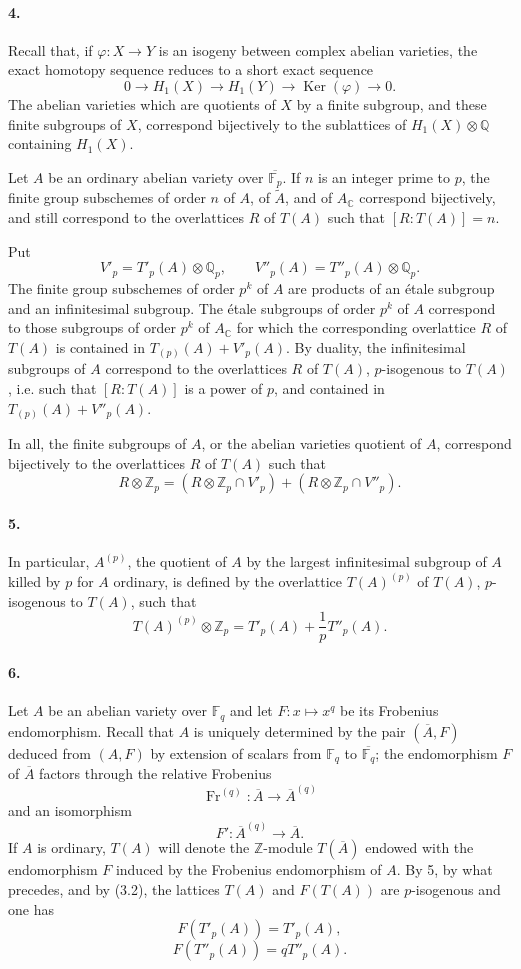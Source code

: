 \documentclass[10pt]{article}
\newcommand{\C}{\mathbb C}
\newcommand{\Fp}{\mathbb F_p}
\newcommand{\Fq}{\mathbb F_q}
\newcommand{\Q}{\mathbb Q}
\newcommand{\Z}{\mathbb Z}
\newcommand{\Ac}{A_{\C}}
\newcommand{\Ker}{\operatorname{Ker}}
\newcommand{\Fr}{\operatorname{Fr}}
\begin{document}
\paragraph{4.} Recall that, if $\varphi:X\to Y$ is an isogeny between complex abelian varieties, the exact homotopy sequence reduces to a short exact sequence
\[
0\longrightarrow H_1(X)\longrightarrow H_1(Y)\longrightarrow\Ker(\varphi)\longrightarrow0.
\]
The abelian varieties which are quotients of $X$ by a finite subgroup, and these finite subgroups of $X$, correspond bijectively to the sublattices of $H_1(X)\otimes\Q$ containing $H_1(X)$.

Let $A$ be an ordinary abelian variety over $\overline{\Fp}$. If $n$ is an integer prime to $p$, the finite group subschemes of order $n$ of $A$, of $\widetilde A$, and of $\Ac$ correspond bijectively, and still correspond to the overlattices $R$ of $T(A)$ such that $[R:T(A)]=n$.

Put
\[
V'_p=T'_p(A)\otimes\Q_p,\qquad V''_p(A)=T''_p(A)\otimes\Q_p.
\]
The finite group subschemes of order $p^k$ of $A$ are products of an étale subgroup and an infinitesimal subgroup. The étale subgroups of order $p^k$ of $A$ correspond to those subgroups of order $p^k$ of $\Ac$ for which the corresponding overlattice $R$ of $T(A)$ is contained in $T_{(p)}(A)+V'_p(A)$. By duality, the infinitesimal subgroups of $A$ correspond to the overlattices $R$ of $T(A)$, $p$-isogenous to $T(A)$, i.e. such that $[R:T(A)]$ is a power of $p$, and contained in $T_{(p)}(A)+V''_p(A)$.

In all, the finite subgroups of $A$, or the abelian varieties quotient of $A$, correspond bijectively to the overlattices $R$ of $T(A)$ such that
\[
\tag{4.1}
R\otimes\Z_p=(R\otimes\Z_p\cap V'_p)+(R\otimes\Z_p\cap V''_p).
\]

\paragraph{5.} In particular, $A^{(p)}$, the quotient of $A$ by the largest infinitesimal subgroup of $A$ killed by $p$ for $A$ ordinary, is defined by the overlattice $T(A)^{(p)}$ of $T(A)$, $p$-isogenous to $T(A)$, such that
\[
T(A)^{(p)}\otimes\Z_p=T'_p(A)+\frac{1}{p}T''_p(A).
\]

\paragraph{6.} Let $A$ be an abelian variety over $\Fq$ and let $F:x\mapsto x^q$ be its Frobenius endomorphism. Recall that $A$ is uniquely determined by the pair $(\overline A,F)$ deduced from $(A,F)$ by extension of scalars from $\Fq$ to $\overline{\Fq}$; the endomorphism $F$ of $\overline A$ factors through the relative Frobenius
\[
\Fr^{(q)}:\overline A\longrightarrow \overline A^{(q)}
\]
and an isomorphism
\[
F':\overline A^{(q)}\longrightarrow\overline A.
\]
If $A$ is ordinary, $T(A)$ will denote the $\Z$-module $T(\overline A)$ endowed with the endomorphism $F$ induced by the Frobenius endomorphism of $A$. By 5, by what precedes, and by (3.2), the lattices $T(A)$ and $F(T(A))$ are $p$-isogenous and one has
\[
\tag{6.1}
F(T'_p(A))=T'_p(A),
\]
\[
\tag{6.2}
F(T''_p(A))=qT''_p(A).
\]
\end{document}
